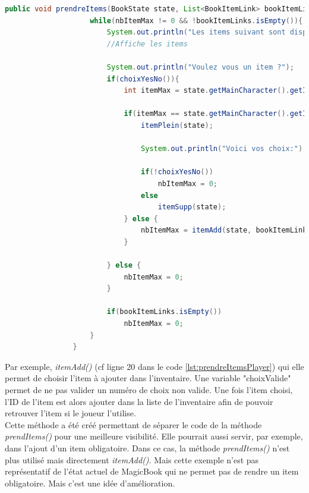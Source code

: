 			\begin{lstlisting}[gobble=16, language=java, label=lst:prendreItemsPlayer, caption=prendreItems() du Player]
				public void prendreItems(BookState state, List<BookItemLink> bookItemLinks, int nbItemMax){
					while(nbItemMax != 0 && !bookItemLinks.isEmpty()){
						System.out.println("Les items suivant sont disponible:");
						//Affiche les items

						System.out.println("Voulez vous un item ?");
						if(choixYesNo()){
							int itemMax = state.getMainCharacter().getItemsMax();

							if(itemMax == state.getMainCharacter().getItems().size()){
								itemPlein(state);

								System.out.println("Voici vos choix:");

								if(!choixYesNo())
									nbItemMax = 0;
								else
									itemSupp(state);
							} else {
								nbItemMax = itemAdd(state, bookItemLinks, nbItemMax);
							}

						} else {
							nbItemMax = 0;
						}

						if(bookItemLinks.isEmpty())
							nbItemMax = 0;
					}
				}

			\end{lstlisting}

			Par exemple, \textit{itemAdd()} (cf ligne 20 dans le code \ref{lst:prendreItemsPlayer}) qui elle permet de choisir l'item à ajouter dans l'inventaire. Une variable "choixValide" permet de ne pas valider un numéro de choix non valide. Une fois l'item choisi, l'ID de l'item est alors ajouter dans la liste de l'inventaire afin de pouvoir retrouver l'item si le joueur l'utilise.\\
			Cette méthode a été créé permettant de séparer le code de la méthode \textit{prendItems()} pour une meilleure visibilité. Elle pourrait aussi servir, par exemple, dans l'ajout d'un item obligatoire. Dans ce cas, la méthode \textit{prendItems()} n'est plus utilisé mais directement \textit{itemAdd()}. Mais cette exemple n'est pas représentatif de l'état actuel de MagicBook qui ne permet pas de rendre un item obligatoire. Mais c'est une idée d'amélioration.\\

